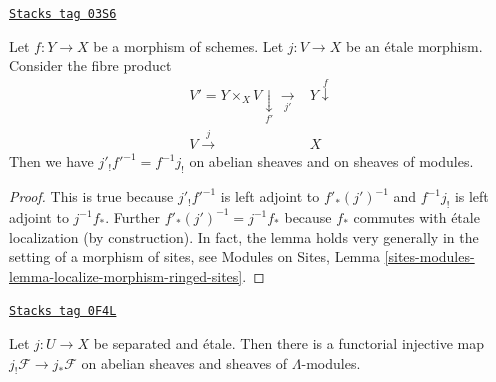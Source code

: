 \begin{lemma}

\label{etale-cohomology-lemma-shriek-base-change}
\href{https://stacks.math.columbia.edu/tag/03S6}{\texttt{Stacks tag 03S6}}

Let $f: Y \to X$ be a morphism of schemes. Let $j: V \to X$ be an \'etale
morphism. Consider the fibre product
$$
\begin{array}{cc}V' = Y \times_X V \underset{f'}{\downarrow}\underset{j'}{\longrightarrow} & Y \overset{f}{\downarrow} \\ V \overset{j}{\longrightarrow} & X\end{array}
$$
Then we have $j'_! f'^{-1} = f^{-1} j_!$ on abelian sheaves and on
sheaves of modules.
\end{lemma}

\begin{proof}
This is true because $j'_! f'^{-1}$ is left adjoint to
$f'_* (j')^{-1}$ and $f^{-1} j_!$ is left adjoint to $j^{-1}f_*$.
Further $f'_* (j')^{-1} = j^{-1}f_*$ because $f_*$ commutes with
\'etale localization (by construction). In fact, the lemma holds very generally
in the setting of a morphism of sites, see
Modules on Sites, Lemma
\ref{sites-modules-lemma-localize-morphism-ringed-sites}.
\end{proof}

\begin{lemma}
\label{etale-cohomology-lemma-shriek-into-star-separated-etale}
\href{https://stacks.math.columbia.edu/tag/0F4L}{\texttt{Stacks tag 0F4L}}

Let $j : U \to X$ be separated and \'etale. Then there is a functorial
injective map $j_!\mathcal{F} \to j_*\mathcal{F}$
on abelian sheaves and sheaves of $\Lambda$-modules.
\end{lemma}

